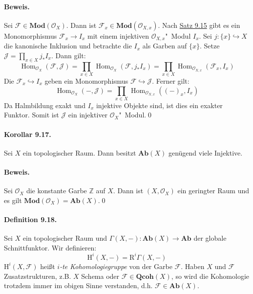 \paragraph{Beweis.} Sei $\mathcal{F}\in\mathbf{Mod}(\mathcal{O}_X)$. Dann ist $\mathcal{F}_x\in\mathbf{Mod}(\mathcal{O}_{X,x})$. Nach \hyperref[9.15]{Satz 9.15} gibt es ein Monomorphismus $\mathcal{F}_x\to I_x$ mit einem injektiven $\mathcal{O}_{X,x}$"~Modul $I_x$. Sei $j:\{x\}\hookrightarrow X$ die kanonische Inklusion und betrachte die $I_x$ als Garben auf $\{x\}$. Setze $\mathcal{J}=\prod_{x\in X}j_\ast I_x$. Dann gilt:
\[\operatorname{Hom}_{\mathcal{O}_X}(\mathcal{F},\mathcal{J}) = \prod_{x\in X}\operatorname{Hom}_{\mathcal{O}_X}(\mathcal{F},j_\ast I_x) = \prod_{x\in X}\operatorname{Hom}_{\mathcal{O}_{X,x}}(\mathcal{F}_x,I_x) \]
Die $\mathcal{F}_x\hookrightarrow I_x$ geben ein Monomorphismus $\mathcal{F}\hookrightarrow \mathcal{J}$. Ferner gilt:
\[\operatorname{Hom}_{\mathcal{O}_X}(-,\mathcal{J})=\prod_{x\in X}\operatorname{Hom}_{\mathcal{O}_{X,x}}((-)_x, I_x) \]
Da Halmbildung exakt und $I_x$ injektive Objekte sind, ist dies ein exakter Funktor. Somit ist $\mathcal{J}$ ein injektiver $\mathcal{O}_X$"~Modul.\qed

\paragraph{Korollar 9.17.}\label{9.17} Sei $X$ ein topologischer Raum. Dann besitzt $\mathbf{Ab}(X)$ genügend viele Injektive.

\paragraph{Beweis.} Sei $\mathcal{O}_X$ die konstante Garbe $\mathbb{Z}$ auf $X$. Dann ist $(X,\mathcal{O}_X)$ ein geringter Raum und es gilt $\mathbf{Mod}(\mathcal{O}_X)=\mathbf{Ab}(X)$.\qed

\paragraph{Definition 9.18.}\label{9.18} Sei $X$ ein topologischer Raum und $\Gamma(X,-):\mathbf{Ab}(X)\to \mathbf{Ab}$ der globale Schnittfunktor. Wir definieren:
\[\mathrm{H}^i(X,-)= \mathrm{R}^i\Gamma(X,-) \]
$\mathrm{H}^i(X,\mathcal{F})$ heißt \textit{$i$-te Kohomologiegruppe} von der Garbe $\mathcal{F}$. Haben $X$ und $\mathcal{F}$ Zusatzstrukturen, z.B. $X$ Schema oder $\mathcal{F}\in \mathbf{Qcoh}(X)$, so wird die Kohomologie trotzdem immer im obigen Sinne verstanden, d.h. $\mathcal{F}\in\mathbf{Ab}(X)$.

